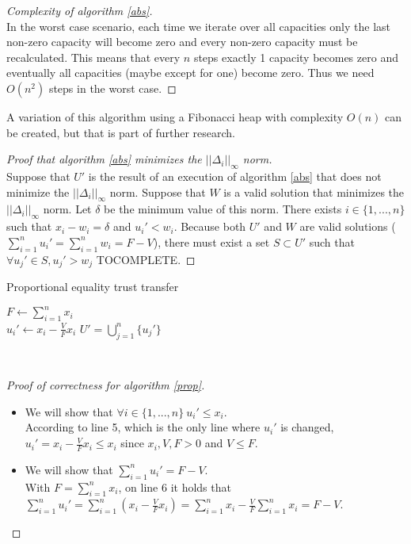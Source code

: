 \documentclass[11pt]{article}
\theoremstyle{definition}
\theoremstyle{corollary}
\begin{document}
    \begin{proof}[Complexity of algorithm \ref{abs}] \ \\
       In the worst case scenario, each time we iterate over all capacities only the last non-zero capacity will become zero
       and every non-zero capacity must be recalculated. This means that every $n$ steps exactly 1 capacity becomes zero
       and eventually all capacities (maybe except for one) become zero. Thus we need $O(n^2)$ steps in the worst case.
    \end{proof}
    A variation of this algorithm using a Fibonacci heap with complexity $O(n)$ can be created, but that is part of 
    further research.
    \begin{proof}[Proof that algorithm \ref{abs} minimizes the $||\Delta_i||_\infty$ norm] \ \\
       Suppose that $U'$ is the result of an execution of algorithm \ref{abs} that does not minimize the $||\Delta_i||_\infty$
       norm. Suppose that $W$ is a valid solution that minimizes the $||\Delta_i||_\infty$ norm. Let $\delta$ be the minimum
       value of this norm. There exists $i \in \{1,...,n\}$ such that $x_i - w_i = \delta$ and $u_i' < w_i$. Because both $U'$
       and $W$ are valid solutions ($\sum\limits_{i=1}^{n}u_i' = \sum\limits_{i=1}^{n}w_i = F - V$), there must exist a set
       $S \subset U'$ such that $\forall u_j' \in S, u_j' > w_j$ TOCOMPLETE.
    \end{proof}
    \begin{algorithm}[H]
       \label{prop}
       \caption{Proportional equality trust transfer}
       $F \gets \sum\limits_{i=1}^{n}x_i$ \\
          {$u_i' \gets x_i - \frac{V}{F} x_i$}
       \Return $U' = \bigcup\limits_{j=1}^{n}\{u_j'\}$
    \end{algorithm} \ \\
    \begin{proof}[Proof of correctness for algorithm \ref{prop}] \
       \begin{itemize}
          \item We will show that $\forall i \in \{1,...,n\} \: u_i' \leq x_i$. \\
          According to line 5, which is the only line where $u_i'$ is changed, $u_i' = x_i - \frac{V}{F}x_i \leq x_i$
          since $x_i, V, F > 0$ and $V \leq F$.
          \item We will show that $\sum\limits_{i=1}^{n}u_i' = F - V$. \\
          With $F = \sum\limits_{i=1}^{n}x_i$, on line 6 it holds that $\sum\limits_{i=1}^{n}u_i' = \sum\limits_{i=1}^{n}
          (x_i - \frac{V}{F}x_i) = \sum\limits_{i=1}^{n}x_i - \frac{V}{F}\sum\limits_{i=1}^{n}x_i = F - V$.
       \end{itemize}
    \end{proof}
\end{document}
